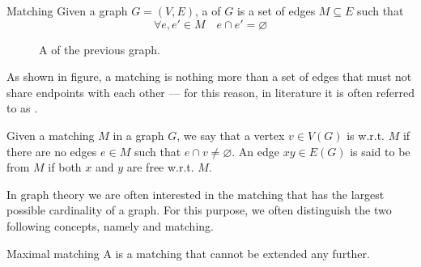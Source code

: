 \documentclass[a4paper, 12pt]{report}
\begin{document}
    \begin{frameddefn}{Matching}
        Given a graph $G = (V, E)$, a  of $G$ is a set of edges $M \subseteq E$ such that $$\forall e, e' \in M \quad e \cap e' = \varnothing$$
    \end{frameddefn}

    \begin{figure}[H]
        \centering
        \caption{A  of the previous graph.}
        \label{matching}
    \end{figure}

    As shown in figure, a matching is nothing more than a set of edges that must not share endpoints with each other — for this reason, in literature it is often referred to as . 

    Given a matching $M$ in a graph $G$, we say that a vertex $v \in V(G)$ is  w.r.t. $M$ if there are no edges $e \in M$ such that $e \cap v \neq \varnothing$. An edge $xy \in E(G)$ is said to be  from $M$ if both $x$ and $y$ are free w.r.t. $M$.

    In graph theory we are often interested in the matching that has the largest possible cardinality of a graph. For this purpose, we often distinguish the two following concepts, namely  and  matching.

    \begin{frameddefn}{Maximal matching}
        A  is a matching that cannot be extended any further.
    \end{frameddefn}
    
\end{document}
